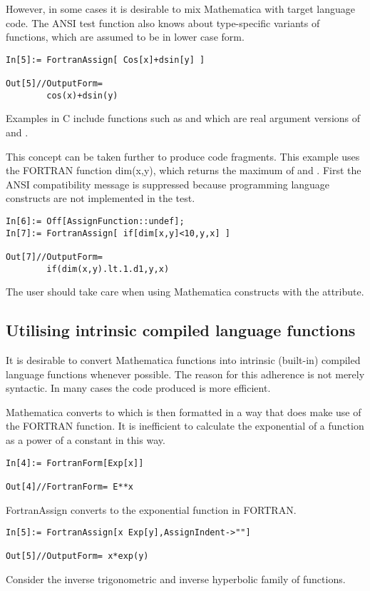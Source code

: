 \documentclass [12pt,twoside]{article}
\begin{document}
However, in some cases it is desirable to mix Mathematica with target language code.
The ANSI test function also knows about type-specific variants of functions, which
are assumed to be in lower case form.

\begin{verbatim}
In[5]:= FortranAssign[ Cos[x]+dsin[y] ]

Out[5]//OutputForm=
        cos(x)+dsin(y)
\end{verbatim}
Examples in C include functions such as  and  which
are real argument versions of  and .

This concept can be taken further to produce code fragments.
This example uses the FORTRAN function dim(x,y), which returns the
maximum of  and . First the ANSI compatibility message is
suppressed because programming language constructs are not implemented in the
test.

\begin{verbatim}
In[6]:= Off[AssignFunction::undef];
In[7]:= FortranAssign[ if[dim[x,y]<10,y,x] ]

Out[7]//OutputForm=
        if(dim(x,y).lt.1.d1,y,x)
\end{verbatim}
The user should take care when using Mathematica constructs with the 
attribute.

\pagebreak[2]

\subsection{Utilising intrinsic compiled language functions}

It is desirable to convert Mathematica functions into intrinsic
(built-in) compiled language functions whenever possible. The reason for
this adherence is not merely syntactic. In many cases the code produced
is more efficient.

Mathematica converts  to  which is then formatted
in a way that does make use of the FORTRAN  function. It is inefficient
to calculate the exponential of a function as a power of a constant 
in this way.

\begin{verbatim}
In[4]:= FortranForm[Exp[x]]

Out[4]//FortranForm= E**x
\end{verbatim}
FortranAssign converts to the exponential function in FORTRAN.

\begin{verbatim}
In[5]:= FortranAssign[x Exp[y],AssignIndent->""]

Out[5]//OutputForm= x*exp(y)
\end{verbatim}
Consider the inverse trigonometric and inverse hyperbolic family of
functions.
\end{document}
